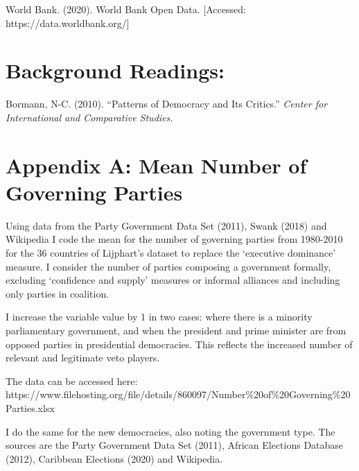\documentclass[11pt, oneside]{article}   	%
\begin{document}
\begin{flushleft}

World Bank. (2020). World Bank Open Data. [Accessed: https://data.worldbank.org/]

\end{flushleft}

\section*{Background Readings:}

\begin{flushleft}
Bormann, N-C. (2010). “Patterns of Democracy and Its Critics.” \textit{Center for International and Comparative Studies.}
\end{flushleft}

\newpage

\section*{Appendix A: Mean Number of Governing Parties}

\begin{flushleft}
Using data from the Party Government Data Set (2011), Swank (2018) and Wikipedia I code the mean for the number of governing parties from 1980-2010 for the 36 countries of Lijphart’s dataset to replace the ‘executive dominance’ measure. I consider the number of parties composing a government formally, excluding ‘confidence and supply’ measures or informal alliances and including only parties in coalition.
\end{flushleft}

\begin{flushleft}
I increase the variable value by 1 in two cases: where there is a minority parliamentary government, and when the president and prime minister are from opposed parties in presidential democracies. This reflects the increased number of relevant and legitimate veto players.
\end{flushleft}

\begin{flushleft}
The data can be accessed here: https://www.filehosting.org/file/details/860097/Number\%20of\%20Governing\%20Parties.xlsx
\end{flushleft}

\begin{flushleft}
I do the same for the new democracies, also noting the government type. The sources are the Party Government Data Set (2011), African Elections Database (2012), Caribbean Elections (2020) and Wikipedia.
\end{flushleft}
\end{document}
